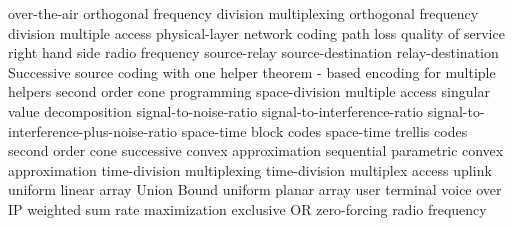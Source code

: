    {over-the-air}
   {orthogonal frequency division multiplexing}
   {orthogonal frequency division multiple access}
 {physical-layer network coding}
   {path loss}
   {quality of service}
 {right hand side}
 {radio frequency}
 {source-relay}
 {source-destination}
 {relay-destination}
 {Successive source coding with one helper theorem - based encoding for multiple helpers}
   {second order cone programming}
   {space-division multiple access}
   {singular value decomposition}
   {signal-to-noise-ratio}
   {signal-to-interference-ratio}
   {signal-to-interference-plus-noise-ratio}
   {space-time block codes}
   {space-time trellis codes}
   {second order cone}
   {successive convex approximation}
   {sequential parametric convex approximation}
   {time-division multiplexing}
   {time-division multiplex access}
   {uplink}
 {uniform linear array}
 {Union Bound}
 {uniform planar array}
 {user terminal}
   {voice over IP}
   {weighted sum rate maximization}
 {exclusive OR}
   {zero-forcing}
 {radio frequency}

